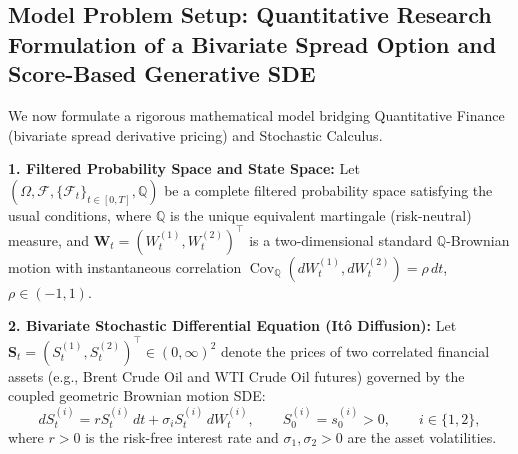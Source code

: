 \documentclass[11pt, letterpaper]{article}
\theoremstyle{definition}
\theoremstyle{remark}
\begin{document}
\subsection{Model Problem Setup: Quantitative Research Formulation of a Bivariate Spread Option and Score-Based Generative SDE}

We now formulate a rigorous mathematical model bridging Quantitative Finance (bivariate spread derivative pricing) and Stochastic Calculus.

\textbf{1. Filtered Probability Space and State Space:}
Let $(\Omega, \mathcal{F}, \{\mathcal{F}_t\}_{t \in [0, T]}, \mathbb{Q})$ be a complete filtered probability space satisfying the usual conditions, where $\mathbb{Q}$ is the unique equivalent martingale (risk-neutral) measure, and $\mathbf{W}_t = (W_t^{(1)}, W_t^{(2)})^\top$ is a two-dimensional standard $\mathbb{Q}$-Brownian motion with instantaneous correlation $\operatorname{Cov}_{\mathbb{Q}}(dW_t^{(1)}, dW_t^{(2)}) = \rho\,dt$, $\rho \in (-1, 1)$.

\textbf{2. Bivariate Stochastic Differential Equation (It\^o Diffusion):}
Let $\mathbf{S}_t = (S_t^{(1)}, S_t^{(2)})^\top \in (0, \infty)^2$ denote the prices of two correlated financial assets (e.g., Brent Crude Oil and WTI Crude Oil futures) governed by the coupled geometric Brownian motion SDE:
\[
    dS_t^{(i)} = r S_t^{(i)}\,dt + \sigma_i S_t^{(i)}\,dW_t^{(i)}, \qquad S_0^{(i)} = s_0^{(i)} > 0, \qquad i \in \{1, 2\},
\]
where $r > 0$ is the risk-free interest rate and $\sigma_1, \sigma_2 > 0$ are the asset volatilities.
\end{document}
